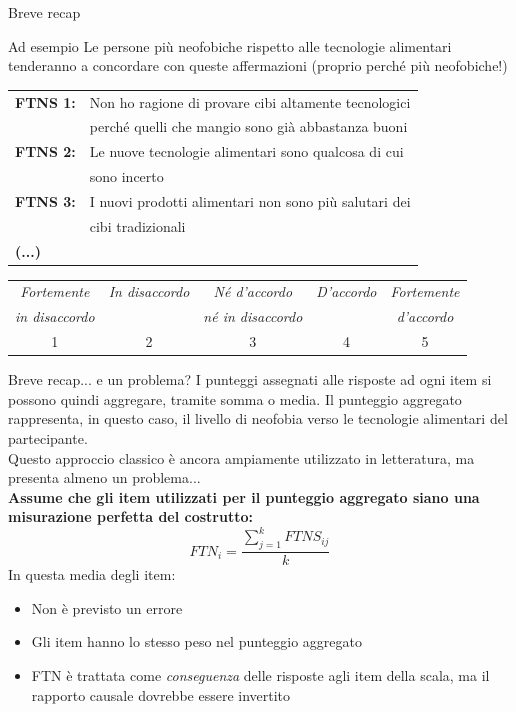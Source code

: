 \documentclass{beamer}
\begin{document}
\begin{frame}{Breve recap}
  \begin{block}{Ad esempio}
    Le persone più neofobiche rispetto alle tecnologie alimentari tenderanno a concordare con queste affermazioni (proprio perché più neofobiche!)
  \end{block}
  \vspace{0.3cm}
  \footnotesize
  \begin{tabular}{l l}
    \textbf{FTNS 1:} & Non ho ragione di provare cibi altamente tecnologici \\
    & perché quelli che mangio sono già abbastanza buoni \\
    \textbf{FTNS 2:} & Le nuove tecnologie alimentari sono qualcosa di cui \\
    & sono incerto \\
    \textbf{FTNS 3:} & I nuovi prodotti alimentari non sono più salutari dei \\ 
    & cibi tradizionali \\
    \textbf{(...)}
  \end{tabular}
  \vspace{0.2cm}
  \begin{center}
    \footnotesize
    \begin{tabular}{ccccc}
      \toprule
      \textit{Fortemente} & \textit{In disaccordo} & \textit{Né d'accordo} & \textit{D'accordo} & \textit{Fortemente} \\
      \textit{in disaccordo} &  & \textit{né in disaccordo} &  & \textit{d'accordo} \\
      \midrule
      1 & 2 & 3 & 4 & 5 \\
      \bottomrule
    \end{tabular}
  \end{center}
\end{frame}

\begin{frame}{Breve recap... e un problema?}
    I punteggi assegnati alle risposte ad ogni item si possono quindi aggregare, tramite somma o media. Il punteggio aggregato rappresenta, in questo caso, il livello di neofobia verso le tecnologie alimentari del partecipante.\\
    Questo approccio classico è ancora ampiamente utilizzato in letteratura, ma presenta almeno un problema... \\
    \pause
    \vspace{1em}
    \textbf{Assume che gli item utilizzati per il punteggio aggregato siano una misurazione perfetta del costrutto:} \\
    \[
    FTN_i = \frac{\sum_{j=1}^{k} FTNS_{ij}}{k}
    \]
    \small
    In questa media degli item:
    \begin{itemize}
        \item Non è previsto un errore
        \item Gli item hanno lo stesso peso nel punteggio aggregato
        \item FTN è trattata come \textit{conseguenza} delle risposte agli item della scala, ma il rapporto causale dovrebbe essere invertito
    \end{itemize}
\end{frame}
\end{document}
